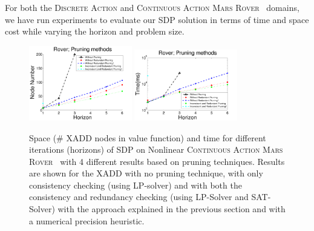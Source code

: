 \documentclass[twoside,11pt]{article}
\newcommand{\MarsRover}{\textsc{Mars Rover }}
\begin{document}
For both the \textsc{Discrete Action} and \textsc{Continuous Action} \MarsRover\ domains, 
we have run experiments to evaluate our SDP solution 
in terms of time and space cost while varying the horizon and problem size.

\begin{figure}[t]
\centering
\includegraphics[width=0.4\textwidth]{Figures2/camdp/contRoverNode.pdf}
\hspace{5mm}
\includegraphics[width=0.4\textwidth]{Figures2/camdp/contRoverTime.pdf}
\vspace{-3mm}
\caption{%
Space (\# XADD nodes in value function) and
time for different iterations (horizons) of SDP on Nonlinear \textsc{Continuous Action}  \MarsRover\ with 4 different results based on pruning techniques. Results are shown for  the XADD 
 with no pruning technique, with only consistency checking (using LP-solver) and with both the consistency and redundancy checking (using LP-Solver and SAT-Solver) with the approach explained in the previous section and with a numerical precision heuristic.} %
\label{fig:roverTS}
\vspace{-6mm}
\end{figure}
\end{document}
